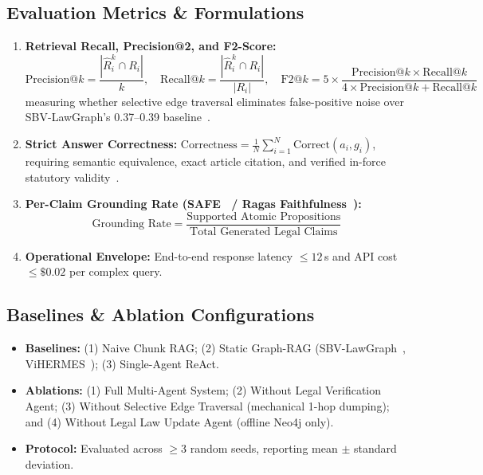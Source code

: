 \subsection{Evaluation Metrics \& Formulations}
\begin{enumerate}
  \item \textbf{Retrieval Recall, Precision@2, and F2-Score:}
    $$\text{Precision@}k = \frac{|\hat{R}_i^k \cap R_i|}{k}, \quad \text{Recall@}k = \frac{|\hat{R}_i^k \cap R_i|}{|R_i|}, \quad \text{F2@}k = 5 \times \frac{\text{Precision@}k \times \text{Recall@}k}{4 \times \text{Precision@}k + \text{Recall@}k}$$
    measuring whether selective edge traversal eliminates false-positive noise over SBV-LawGraph's 0.37--0.39 baseline~\cite{phan2026sbvlawgraph}.
  \item \textbf{Strict Answer Correctness:} $\text{Correctness} = \frac{1}{N} \sum_{i=1}^N \text{Correct}(a_i, g_i)$, requiring semantic equivalence, exact article citation, and verified in-force statutory validity~\cite{zhou2026lexagent}.
  \item \textbf{Per-Claim Grounding Rate (SAFE~\cite{wei2024safe} / Ragas Faithfulness~\cite{es2024ragas}):}
    $$\text{Grounding Rate} = \frac{\text{Supported Atomic Propositions}}{\text{Total Generated Legal Claims}}$$
  \item \textbf{Operational Envelope:} End-to-end response latency $\le 12$\,s and API cost $\le \$0.02$ per complex query.
\end{enumerate}

\subsection{Baselines \& Ablation Configurations}
\begin{itemize}
  \item \textbf{Baselines:} (1) Naive Chunk RAG; (2) Static Graph-RAG (SBV-LawGraph~\cite{phan2026sbvlawgraph}, ViHERMES~\cite{vihermes2024}); (3) Single-Agent ReAct.
  \item \textbf{Ablations:} (1) Full Multi-Agent System; (2) Without Legal Verification Agent; (3) Without Selective Edge Traversal (mechanical 1-hop dumping); and (4) Without Legal Law Update Agent (offline Neo4j only).
  \item \textbf{Protocol:} Evaluated across $\ge 3$ random seeds, reporting mean $\pm$ standard deviation.
\end{itemize}

